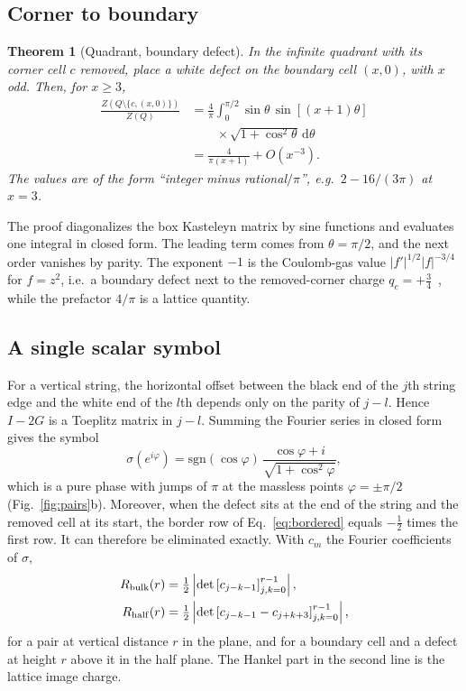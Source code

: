 \documentclass[aps,pre,twocolumn,superscriptaddress,nofootinbib,floatfix]{revtex4-2}
\newtheorem{theorem}{Theorem}
\newcommand{\dd}{\mathrm{d}}
\begin{document}
\subsection{Corner to boundary}
\begin{theorem}[Quadrant, boundary defect]
In the infinite quadrant with its corner cell $c$ removed, place a white defect on the boundary cell $(x,0)$, with $x$ odd. Then, for $x\ge3$,
\begin{equation}
\begin{split}\frac{Z(Q\setminus\{c,(x,0)\})}{Z(Q)}&=\frac4\pi\int_0^{\pi/2}\!\sin\theta\,\sin[(x+1)\theta]\\&\qquad\times\sqrt{1+\cos^2\theta}\,\dd\theta\\
&=\frac{4}{\pi(x+1)}+O(x^{-3}).\end{split}
\label{eq:thmA}
\end{equation}
The values are of the form ``integer minus rational$/\pi$'', e.g.\ $2-16/(3\pi)$ at $x=3$.
\end{theorem}
The proof diagonalizes the box Kasteleyn matrix by sine functions and evaluates one integral in closed form. The leading term comes from $\theta=\pi/2$, and the next order vanishes by parity. The exponent $-1$ is the Coulomb-gas value $|f'|^{1/2}|f|^{-3/4}$ for $f=z^2$, i.e.\ a boundary defect next to the removed-corner charge $q_c=+\tfrac34$~\cite{PaperII}, while the prefactor $4/\pi$ is a lattice quantity.

\subsection{A single scalar symbol}
For a vertical string, the horizontal offset between the black end of the $j$th string edge and the white end of the $l$th depends only on the parity of $j-l$. Hence $I-2G$ is a Toeplitz matrix in $j-l$. Summing the Fourier series in closed form gives the symbol
\begin{equation}
\sigma(e^{i\varphi})=\mathrm{sgn}(\cos\varphi)\,\frac{\cos\varphi+i}{\sqrt{1+\cos^2\varphi}},
\label{eq:sigma}
\end{equation}
which is a pure phase with jumps of $\pi$ at the massless points $\varphi=\pm\pi/2$ (Fig.~\ref{fig:pairs}b). Moreover, when the defect sits at the end of the string and the removed cell at its start, the border row of Eq.~\eqref{eq:bordered} equals $-\tfrac12$ times the first row. It can therefore be eliminated exactly. With $c_m$ the Fourier coefficients of $\sigma$,
\begin{align}
R_{\rm bulk}(r)&=\tfrac12\left|\det\left[c_{j-k-1}\right]_{j,k=0}^{r-1}\right|,\\
R_{\rm half}(r)&=\tfrac12\left|\det\left[c_{j-k-1}-c_{j+k+3}\right]_{j,k=0}^{r-1}\right|,
\label{eq:reductions}
\end{align}
for a pair at vertical distance $r$ in the plane, and for a boundary cell and a defect at height $r$ above it in the half plane. The Hankel part in the second line is the lattice image charge.
\end{document}
